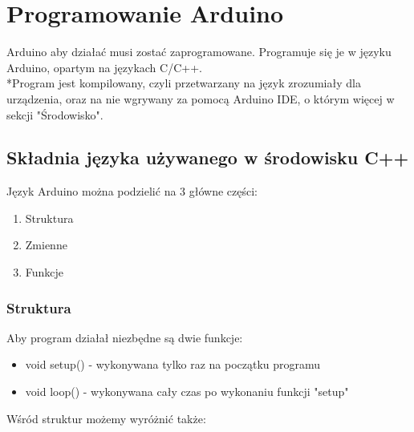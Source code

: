 \tableofcontents 


\section{Programowanie Arduino}

\hspace{4ex} Arduino aby działać musi zostać zaprogramowane. Programuje się je w języku Arduino, opartym na językach C/C++.
\\*Program jest kompilowany, czyli przetwarzany na język zrozumiały dla urządzenia, oraz na nie wgrywany za pomocą
Arduino IDE, o którym więcej w sekcji "Środowisko". 



\subsection {Składnia języka używanego w środowisku C++}
  Język Arduino można podzielić na 3 główne części:
  \begin{enumerate}
	\item Struktura
	\item Zmienne
	\item Funkcje
\end{enumerate}
\subsubsection  {Struktura}
	Aby program działał niezbędne są dwie funkcje:
	\renewcommand{\labelitemii}{$\circ$}
	\begin{itemize}
	
	  \item void setup() - wykonywana tylko raz na początku programu
		
	  \item void loop() - wykonywana cały czas po wykonaniu funkcji "setup"
	 
	\end{itemize}
	Wśród struktur możemy wyróżnić także:

